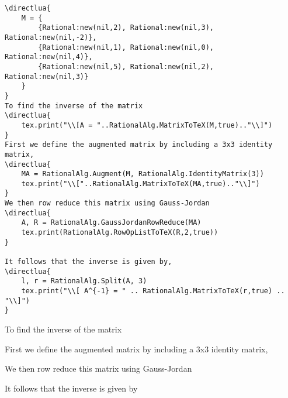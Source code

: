 \documentclass[11pt]{article}
\begin{document}
\begin{lstlisting}
\directlua{
    M = {
        {Rational:new(nil,2), Rational:new(nil,3), Rational:new(nil,-2)},
        {Rational:new(nil,1), Rational:new(nil,0), Rational:new(nil,4)},
        {Rational:new(nil,5), Rational:new(nil,2), Rational:new(nil,3)}    
    }
}
To find the inverse of the matrix
\directlua{
    tex.print("\\[A = "..RationalAlg.MatrixToTeX(M,true).."\\]")
}
First we define the augmented matrix by including a 3x3 identity matrix,
\directlua{
    MA = RationalAlg.Augment(M, RationalAlg.IdentityMatrix(3))
    tex.print("\\["..RationalAlg.MatrixToTeX(MA,true).."\\]")
}
We then row reduce this matrix using Gauss-Jordan
\directlua{
    A, R = RationalAlg.GaussJordanRowReduce(MA)
    tex.print(RationalAlg.RowOpListToTeX(R,2,true)) 
}

It follows that the inverse is given by,
\directlua{
    l, r = RationalAlg.Split(A, 3)
    tex.print("\\[ A^{-1} = " .. RationalAlg.MatrixToTeX(r,true) .. "\\]")
}
\end{lstlisting}


To find the inverse of the matrix

First we define the augmented matrix by including a 3x3 identity matrix,


We then row reduce this matrix using Gauss-Jordan


It follows that the inverse is given by

\end{document}
